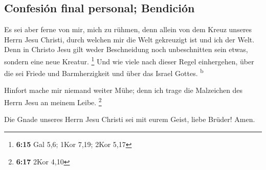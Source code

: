 \hypertarget{confesiuxf3n-final-personal-bendiciuxf3n}{%
\subsection{Confesión final personal;
Bendición}\label{confesiuxf3n-final-personal-bendiciuxf3n}}

 Es sei aber ferne von mir, mich zu rühmen, denn allein
von dem Kreuz unseres Herrn Jesu Christi, durch welchen mir die Welt
gekreuzigt ist und ich der Welt.  Denn in Christo Jesu
gilt weder Beschneidung noch unbeschnitten sein etwas, sondern eine neue
Kreatur. \footnote{\textbf{6:15} Gal 5,6; 1Kor 7,19; 2Kor 5,17}
 Und wie viele nach dieser Regel einhergehen, über die
sei Friede und Barmherzigkeit und über das Israel Gottes.
\textsuperscript{b}

 Hinfort mache mir niemand weiter Mühe; denn ich trage
die Malzeichen des Herrn Jesu an meinem Leibe. \footnote{\textbf{6:17}
  2Kor 4,10}

 Die Gnade unseres Herrn Jesu Christi sei mit eurem
Geist, liebe Brüder! Amen.
